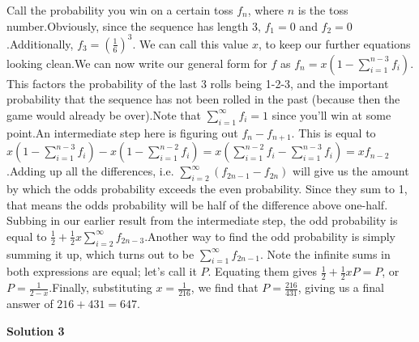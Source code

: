 \begin{enumerate}
Call the probability you win on a certain toss $f_n$, where $n$ is the toss number.Obviously, since the sequence has length 3, $f_1=0$ and $f_2=0$.Additionally, $f_3=\left(\frac{1}{6}\right)^3$. We can call this value $x$, to keep our further equations looking clean.We can now write our general form for $f$ as $f_n=x\left(1-\sum_{i=1}^{n-3}f_i\right)$. This factors the probability of the last 3 rolls being 1-2-3, and the important probability that the sequence has not been rolled in the past (because then the game would already be over).Note that $\sum_{i=1}^{\infty}f_i=1$ since you'll win at some point.An intermediate step here is figuring out $f_n-f_{n+1}$. This is equal to $x\left(1-\sum_{i=1}^{n-3}f_i\right)-x\left(1-\sum_{i=1}^{n-2}f_i\right)=x\left(\sum_{i=1}^{n-2}f_i-\sum_{i=1}^{n-3}f_i\right)=xf_{n-2}$.Adding up all the differences, i.e. $\sum_{i=2}^{\infty}(f_{2n-1}-f_{2n})$ will give us the amount by which the odds probability exceeds the even probability. Since they sum to 1, that means the odds probability will be half of the difference above one-half. Subbing in our earlier result from the intermediate step, the odd probability is equal to $\frac{1}{2}+\frac{1}{2}x\sum_{i=2}^{\infty}f_{2n-3}$.Another way to find the odd probability is simply summing it up, which turns out to be $\sum_{i=1}^{\infty}f_{2n-1}$. Note the infinite sums in both expressions are equal; let's call it $P$. Equating them gives $\frac{1}{2}+\frac{1}{2}xP=P$, or $P=\frac{1}{2-x}$.Finally, substituting $x=\frac{1}{216}$, we find that $P=\frac{216}{431}$, giving us a final answer of $216 + 431 = \boxed{647}$.

 



\textbf{Solution 3}


\end{enumerate}
